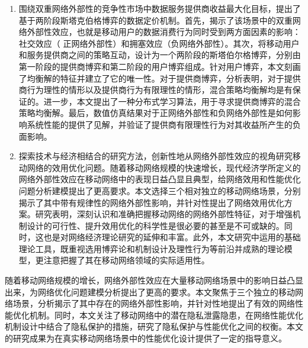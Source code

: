 \begin{enumerate}
  \item 围绕双重网络外部性的竞争性市场中数据服务提供商收益最大化目标，提出了基于两阶段斯塔克伯格博弈的数据定价机制。首先，揭示了该场景中的双重网络外部性效应，也就是移动用户的数据消费行为同时受到两方面因素的影响：社交效应（ 正网络外部性）和拥塞效应（负网络外部性）。其次，将移动用户和服务提供商之间的策略互动，设计为一个两阶段的斯塔伯尔格博弈，分别由第一阶段的提供商博弈和第二阶段的用户博弈组成。针对用户博弈，本文刻画了均衡解的特征并建立了它的唯一性。对于提供商博弈，分析表明，对于提供商行为理性的情形以及提供商行为有限理性的情形，混合策略均衡解均是有保证的。进一步，本文提出了一种分布式学习算法，用于寻求提供商博弈的混合策略均衡解。最后，数值仿真结果对于正网络外部性和负网络外部性是如何影响系统性能的提供了见解，并验证了提供商有限理性行为对其收益所产生的负面影响。
  
 \item 探索技术与经济相结合的研究方法，创新性地从网络外部性效应的视角研究移动网络的效用优化问题。随着移动网络规模的快速增长，现代经济学所定义的网络外部性效应在移动网络中的表现日益凸显且典型，给网络效用和性能优化问题分析建模提出了更高要求。本文选择三个相对独立的移动网络场景，分别揭示了其中带有规律性的网络外部性影响，并针对性提出了网络效用优化方案。研究表明，深刻认识和准确把握移动网络的网络外部性特征，对于增强机制设计的可行性、提升效用优化的科学性是很必要的甚至是不可或缺的。同时，这也是对网络经济理论研究的延伸和丰富。此外，本文研究中运用的基础理论工具，既重视选用博弈论和机制设计及理性行为等前沿并成熟的理论模型，更注意把握了其在移动网络领域的实际适用性。
  
     
\end{enumerate}

随着移动网络规模的增长，网络外部性效应在大量移动网络场景中的影响日益凸显出来，为网络优化问题建模分析提出了更高的要求。本文聚焦于三个独立的移动网络场景，分析揭示了其中存在的网络外部性影响，并针对性地提出了有效的网络性能优化机制。同时，本文关注了移动网络中的潜在隐私泄露隐患，在网络性能优化机制设计中结合了隐私保护的措施，研究了隐私保护与性能优化之间的权衡。本文的研究成果为在真实移动网络场景中的性能优化设计提供了一定的指导意义。

